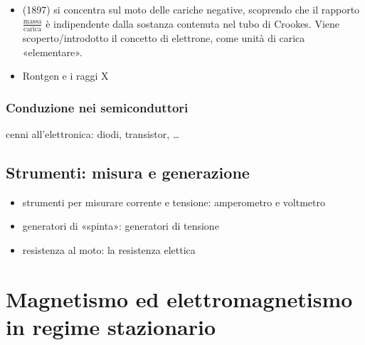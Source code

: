 \documentclass[letterpaper,10pt,italian]{jupyterBook}
\begin{document}
\begin{itemize}
\item {} 
\sphinxAtStartPar
{\hyperref[\detokenize{ch/modern/experiments:modern-experiments-thomson-electron}]{}} (1897) si concentra sul moto delle cariche negative, scoprendo che il rapporto \(\frac{\text{massa}}{\text{carica}}\) è indipendente dalla sostanza contenuta nel tubo di Crookes. Viene scoperto/introdotto il concetto di elettrone, come unità di carica «elementare».

\item {} 
\sphinxAtStartPar
Rontgen e i raggi X  

\end{itemize}


\subsubsection{Conduzione nei semiconduttori}
\label{\detokenize{ch/electromagnetism/electric-current:conduzione-nei-semiconduttori}}\label{\detokenize{ch/electromagnetism/electric-current:physics-hs-electromagnetism-electric-current-semiconductor}}
\sphinxAtStartPar
cenni all’elettronica: diodi, transistor, …


\subsection{Strumenti: misura e generazione}
\label{\detokenize{ch/electromagnetism/electric-current:strumenti-misura-e-generazione}}\label{\detokenize{ch/electromagnetism/electric-current:physics-hs-electromagnetism-electric-current-instruments}}
\sphinxAtStartPar
{}
\begin{itemize}
\item {} 
\sphinxAtStartPar
strumenti per misurare corrente e tensione: amperometro e voltmetro

\item {} 
\sphinxAtStartPar
generatori di «spinta»: generatori di tensione

\item {} 
\sphinxAtStartPar
resistenza al moto: la resistenza elettica

\end{itemize}

\sphinxstepscope


\section{Magnetismo ed elettromagnetismo in regime stazionario}
\label{\detokenize{ch/electromagnetism/electromagnetism-steady:magnetismo-ed-elettromagnetismo-in-regime-stazionario}}\label{\detokenize{ch/electromagnetism/electromagnetism-steady:physics-hs-electromagnetism-electromagnetism-steady}}\label{\detokenize{ch/electromagnetism/electromagnetism-steady::doc}}
\end{document}

